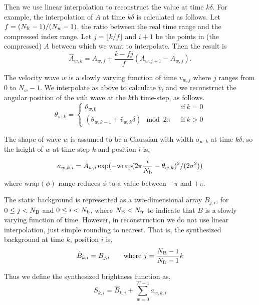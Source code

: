 \documentclass{article}
\begin{document}
Then we use linear interpolation to reconstruct the value at time $k\delta$.
For example, the interpolation of $A$ at time $k \delta$
is calculated as follows.
Let $f=({N_\mathrm{fr}}-1)/(N_w-1)$, the ratio between the real time range and the compressed index range.
Let $j=\lfloor k/f \rfloor$ and $i+1$ be the points
in (the compressed) $A$ between which we want to interpolate.
Then the result is
\begin{equation}\label{Ahat}
 \hat{A}_{w,k} = A_{w,j} + \frac{k-fj}{f}(A_{w,j+1}-A_{w,j}).
\end{equation}

The velocity wave $w$ is a slowly varying function of time $v_{w,j}$ where $j$ ranges
from $0$ to $N_w-1$.  We interpolate as above to calculate $\hat{v}$,
and we reconstruct the angular position of the $w$th wave at the $k$th time-step, as follows.
\begin{equation}\label{thetawk}
\theta_{w,k} = \left\{ 
\begin{array}{ll}
\theta_{w,0} & \mathrm{if}~k=0 \\ 
(\theta_{w,k-1}+\hat{v}_{w,k}\delta) \mod 2\pi  ~~~& \mathrm{if}~k>0
\end{array}
\right.
\end{equation}

The shape of wave $w$ is assumed to be a Gaussian with width $\sigma_{w,k}$ at time $k\delta$,
so the height of $w$ at time-step $k$ and position $i$ is,
\begin{equation}\label{awki}
a_{w,k,i} = \hat{A}_{w,i}\exp(-\mathrm{wrap}(2\pi\frac{i}{{N_\mathrm{b}}} - \theta_{w,k})^2 / (2\sigma ^2 ))
\end{equation}
where $\mathrm{wrap}(\phi)$ range-reduces $\phi$ to a value between $-\pi$ and $+\pi$.

The static background is represented as a two-dimensional array $B_{j,i}$,
for $0 \le j < {N_\mathrm{B}}$ and $0 \le i < {N_\mathrm{b}}$, where ${N_\mathrm{B}} < {N_\mathrm{fr}}$ to indicate that
$B$ is a slowly varying function of time.
However, in reconstruction we do not use linear interpolation, just simple rounding to nearest.
That is, the synthesized background at time $k$, position $i$ is,
\begin{equation}\label{Bki}
\hat{B}_{k,i} = B_{j,i}\qquad \mathrm{where}~j=\frac{{N_\mathrm{B}}-1}{{N_\mathrm{fr}}-1}k
\end{equation}


Thus we define the synthesized brightness function as,
\begin{equation}\label{Ski}
S_{k,i} = \hat{B}_{k,i} + \sum_{w=0}^{W-1} a_{w,k,i}
\end{equation}
\end{document}
